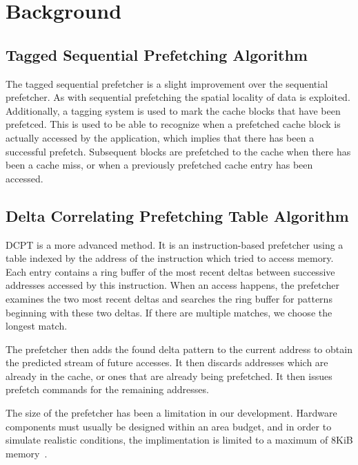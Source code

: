 \section{Background}

\subsection*{Tagged Sequential Prefetching Algorithm}

The tagged sequential prefetcher is a slight improvement over the sequential
prefetcher. As with sequential prefetching the spatial locality of data is
exploited. Additionally, a tagging system is used to mark the cache blocks that
have been prefetced. This is used to be able to recognize when a prefetched
cache block is actually accessed by the application, which implies that there
has been a successful prefetch. Subsequent blocks are prefetched to the cache
when there has been a cache miss, or when a previously prefetched cache entry
has been accessed\cite{grannaes}.

\subsection*{Delta Correlating Prefetching Table Algorithm}

DCPT is a more advanced method. It is an instruction-based prefetcher using a
table indexed by the address of the instruction which tried to access memory.
Each entry contains a ring buffer of the most recent deltas between successive
addresses accessed by this instruction. When an access happens, the prefetcher
examines the two most recent deltas and searches the ring buffer for patterns
beginning with these two deltas. If there are multiple matches, we choose the
longest match.

The prefetcher then adds the found delta pattern to the current address to
obtain the predicted stream of future accesses. It then discards addresses which
are already in the cache, or ones that are already being prefetched. It then
issues prefetch commands for the remaining addresses.


The size of the prefetcher has been a limitation in our development. Hardware
components must usually be designed within an area budget, and in order to
simulate realistic conditions, the implimentation is limited to a maximum of
8KiB memory~\cite{guidelines}.

